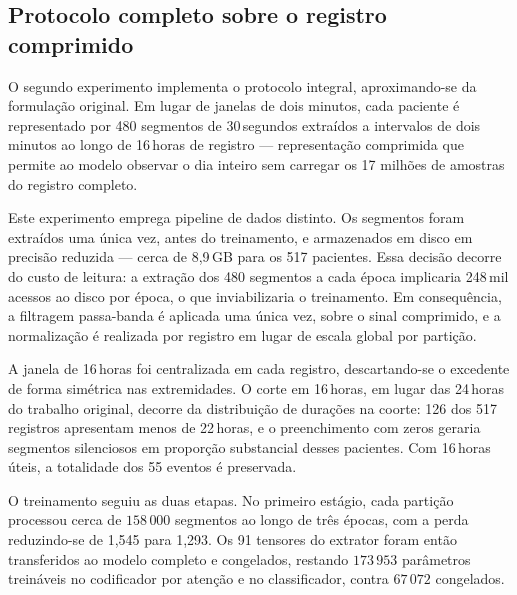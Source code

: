 \subsection{Protocolo completo sobre o registro comprimido}
\label{subsec:deephhf-2estagios}

O segundo experimento implementa o protocolo integral, aproximando-se da
formulação original. Em lugar de janelas de dois minutos, cada paciente é
representado por 480 segmentos de 30\,segundos extraídos a intervalos de
dois minutos ao longo de 16\,horas de registro --- representação comprimida
que permite ao modelo observar o dia inteiro sem carregar os 17 milhões de
amostras do registro completo.

Este experimento emprega pipeline de dados distinto. Os segmentos foram
extraídos uma única vez, antes do treinamento, e armazenados em disco em
precisão reduzida --- cerca de 8,9\,GB para os 517 pacientes. Essa decisão
decorre do custo de leitura: a extração dos 480 segmentos a cada época
implicaria 248\,mil acessos ao disco por época, o que inviabilizaria o
treinamento. Em consequência, a filtragem passa-banda é aplicada uma única
vez, sobre o sinal comprimido, e a normalização é realizada por registro em
lugar de escala global por partição.

A janela de 16\,horas foi centralizada em cada registro, descartando-se o
excedente de forma simétrica nas extremidades. O corte em 16\,horas, em
lugar das 24\,horas do trabalho original, decorre da distribuição de
durações na coorte: 126 dos 517 registros apresentam menos de 22\,horas, e o
preenchimento com zeros geraria segmentos silenciosos em proporção
substancial desses pacientes. Com 16\,horas úteis, a totalidade dos 55
eventos é preservada.

O treinamento seguiu as duas etapas. No primeiro estágio, cada partição
processou cerca de $158\,000$ segmentos ao longo de três épocas, com a perda
reduzindo-se de 1,545 para 1,293. Os 91 tensores do extrator foram então
transferidos ao modelo completo e congelados, restando $173\,953$ parâmetros
treináveis no codificador por atenção e no classificador, contra $67\,072$
congelados.

